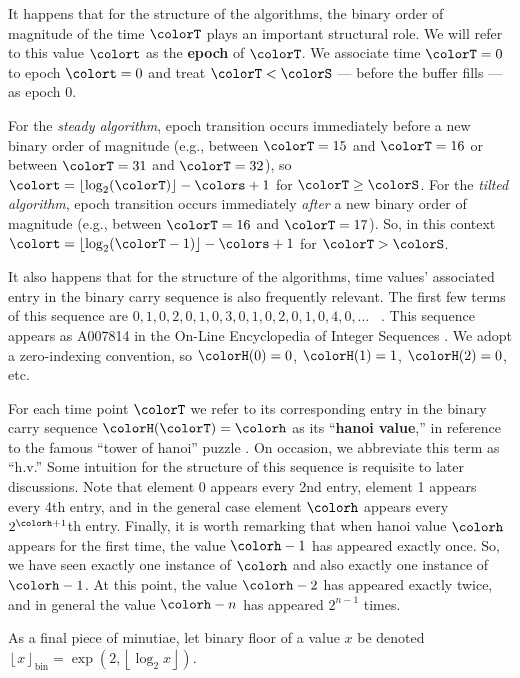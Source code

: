 It happens that for the structure of the algorithms, the binary order of magnitude of the time $\colorT$ plays an important structural role.
We will refer to this value $\colort$ as the \textbf{epoch} of $\colorT$.
We associate time $\colorT=0$ to epoch $\colort=0$ and treat $\colorT < \colorS$ --- before the buffer fills --- as epoch 0.

For the \textit{steady algorithm}, epoch transition occurs immediately before a new binary order of magnitude (e.g., between $\colorT = 15$ and $\colorT = 16$ or between $\colorT = 31$ and $\colorT = 32$), so $\colort = \left\lfloor \log_2(\colorT) \right\rfloor - \colors + 1$ for $\colorT \geq \colorS$.
For the \textit{tilted algorithm}, epoch transition occurs immediately \textit{after} a new binary order of magnitude (e.g., between $\colorT = 16$ and $\colorT = 17$).
So, in this context $\colort = \left\lfloor \log_2(\colorT - 1) \right\rfloor - \colors + 1$ for $\colorT > \colorS$.

It also happens that for the structure of the algorithms, time values' associated entry in the binary carry sequence is also frequently relevant.
The first few terms of this sequence are $0, 1, 0, 2, 0, 1, 0, 3, 0, 1, 0, 2, 0, 1, 0, 4, 0, \ldots$ \, .
This sequence appears as A007814 in the On-Line Encyclopedia of Integer Sequences \citep{oeis}.
We adopt a zero-indexing convention, so $\colorH(0) = 0$, $\colorH(1) = 1$, $\colorH(2) = 0$, etc.

For each time point $\colorT$ we refer to its corresponding entry in the binary carry sequence $\colorH(\colorT) = \colorh$ as its ``\textbf{hanoi value},'' in reference to the famous ``tower of hanoi'' puzzle \citep{lucas1889jeux}.
On occasion, we abbreviate this term as ``h.v.''
Some intuition for the structure of this sequence is requisite to later discussions.
Note that element 0 appears every 2nd entry, element 1 appears every 4th entry, and in the general case element $\colorh$ appears every $2^{\colorh+1}$th entry.
Finally, it is worth remarking that when hanoi value $\colorh$ appears for the first time, the value $\colorh - 1$ has appeared exactly once.
So, we have seen exactly one instance of $\colorh$ and also exactly one instance of $\colorh - 1$.
At this point, the value $\colorh - 2$ has appeared exactly twice, and in general the value $\colorh - n$ has appeared $2^{n - 1}$ times.

As a final piece of minutiae, let binary floor of a value $x$ be denoted $\left\lfloor x \right\rfloor_\mathrm{bin} = \exp(2, \left\lfloor \log_2 x \right\rfloor)$.
